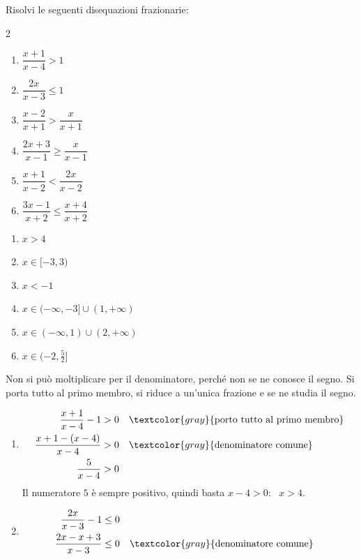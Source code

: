 \begin{question}[ID=2.2, subtitle={Disequazioni frazionarie}, difficulty=media, tags={disequazioni frazionarie}]
Risolvi le seguenti disequazioni frazionarie:
\begin{multicols}{2}
\begin{enumerate}[leftmargin=3.2cm]
    \item $\dfrac{x+1}{x-4} > 1$
    \item $\dfrac{2x}{x-3} \leq 1$
    \item $\dfrac{x-2}{x+1} > \dfrac{x}{x+1}$
    \item $\dfrac{2x+3}{x-1} \geq \dfrac{x}{x-1}$
    \item $\dfrac{x+1}{x-2} < \dfrac{2x}{x-2}$
    \item $\dfrac{3x-1}{x+2} \leq \dfrac{x+4}{x+2}$
\end{enumerate}
\end{multicols}
\begin{solution}
\begin{enumerate}
    \item $x>4$
    \item $x\in[-3,3)$
    \item $x<-1$
    \item $x\in(-\infty,-3]\cup(1,+\infty)$
    \item $x\in(-\infty,1)\cup(2,+\infty)$
    \item $x\in(-2,\tfrac52]$
\end{enumerate}
\end{solution}
\begin{explanation}
Non si può moltiplicare per il denominatore, perché non se ne conosce il segno. Si porta tutto al primo membro, si riduce a un'unica frazione e se ne studia il segno.
\begin{enumerate}
    \item \[\begin{aligned}
    \dfrac{x+1}{x-4}-1 &> 0 && \textcolor{gray}{\text{porto tutto al primo membro}}\\
    \dfrac{x+1-(x-4)}{x-4} &> 0 && \textcolor{gray}{\text{denominatore comune}}\\
    \dfrac{5}{x-4} &> 0
    \end{aligned}\]
    Il numeratore $5$ è sempre positivo, quindi basta $x-4>0$: \ $x>4$.
    \item \[\begin{aligned}
    \dfrac{2x}{x-3}-1 &\leq 0\\
    \dfrac{2x-x+3}{x-3} &\leq 0 && \textcolor{gray}{\text{denominatore comune}}\\

\end{aligned}\]
\end{enumerate}
\end{explanation}
\end{question}
